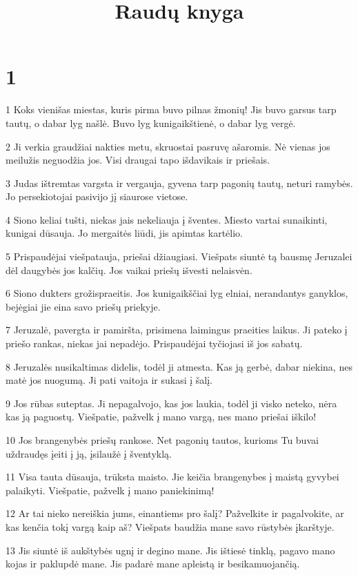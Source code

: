 

\title{Raudų knyga}

\chapter{1}


\par 1 Koks vienišas miestas, kuris pirma buvo pilnas žmonių! Jis buvo garsus tarp tautų, o dabar lyg našlė. Buvo lyg kunigaikštienė, o dabar lyg vergė. 
\par 2 Ji verkia graudžiai nakties metu, skruostai pasruvę ašaromis. Nė vienas jos meilužis neguodžia jos. Visi draugai tapo išdavikais ir priešais. 
\par 3 Judas ištremtas vargsta ir vergauja, gyvena tarp pagonių tautų, neturi ramybės. Jo persekiotojai pasivijo jį siaurose vietose. 
\par 4 Siono keliai tušti, niekas jais nekeliauja į šventes. Miesto vartai sunaikinti, kunigai dūsauja. Jo mergaitės liūdi, jis apimtas kartėlio. 
\par 5 Prispaudėjai viešpatauja, priešai džiaugiasi. Viešpats siuntė tą bausmę Jeruzalei dėl daugybės jos kalčių. Jos vaikai priešų išvesti nelaisvėn. 
\par 6 Siono dukters grožis­praeitis. Jos kunigaikščiai lyg elniai, nerandantys ganyklos, bejėgiai jie eina savo priešų priekyje. 
\par 7 Jeruzalė, pavergta ir pamiršta, prisimena laimingus praeities laikus. Ji pateko į priešo rankas, niekas jai nepadėjo. Prispaudėjai tyčiojasi iš jos sabatų. 
\par 8 Jeruzalės nusikaltimas didelis, todėl ji atmesta. Kas ją gerbė, dabar niekina, nes matė jos nuogumą. Ji pati vaitoja ir sukasi į šalį. 
\par 9 Jos rūbas suteptas. Ji nepagalvojo, kas jos laukia, todėl ji visko neteko, nėra kas ją paguostų. Viešpatie, pažvelk į mano vargą, nes mano priešai iškilo! 
\par 10 Jos brangenybės priešų rankose. Net pagonių tautos, kurioms Tu buvai uždraudęs įeiti į ją, įsilaužė į šventyklą. 
\par 11 Visa tauta dūsauja, trūksta maisto. Jie keičia brangenybes į maistą gyvybei palaikyti. Viešpatie, pažvelk į mano paniekinimą! 
\par 12 Ar tai nieko nereiškia jums, einantiems pro šalį? Pažvelkite ir pagalvokite, ar kas kenčia tokį vargą kaip aš? Viešpats baudžia mane savo rūstybės įkarštyje. 
\par 13 Jis siuntė iš aukštybės ugnį ir degino mane. Jis ištiesė tinklą, pagavo mano kojas ir paklupdė mane. Jis padarė mane apleistą ir besikamuojančią. 
